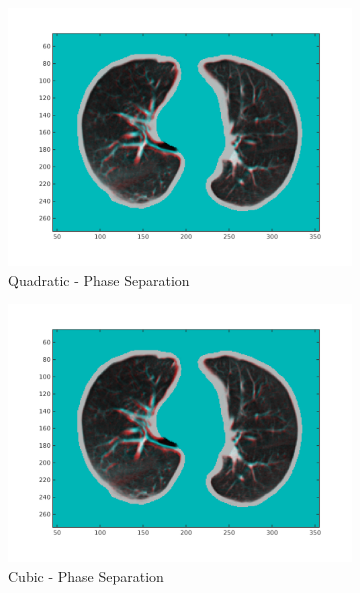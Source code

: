 \documentclass[11pt,a4paper,oneside]{report}
\begin{document}
\begin{figure}[H]
\begin{subfigure}[b]{0.33\textwidth}
    \includegraphics[width=\textwidth, trim=0 50 0 0,clip=true]{figures/task4/visAss_m1.png}
    \caption{Quadratic - Phase Separation}
  \end{subfigure}
  \begin{subfigure}[b]{0.33\textwidth}
    \includegraphics[width=\textwidth, trim=0 50 0 0,clip=true]{figures/task4/visAss_m3.png}
    \caption{Cubic - Phase Separation}
  \end{subfigure}
  ~
  \hspace*{-2em}
  \begin{subfigure}[b]{0.33\textwidth}

\end{subfigure}
\end{figure}
\end{document}
